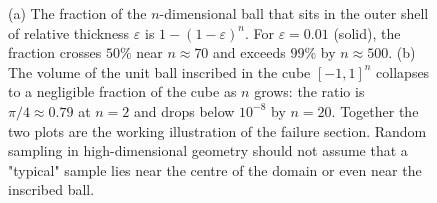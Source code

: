 \begin{figure}[p]
\begin{tikzpicture}
\end{tikzpicture}
\caption[High-dimensional volume concentration in the ball and the
cube.]{(a) The fraction of the $n$-dimensional ball that sits in the
outer shell of relative thickness $\varepsilon$ is $1 - (1 -
\varepsilon)^{n}$. For $\varepsilon = 0.01$ (solid), the fraction
crosses $50\%$ near $n \approx 70$ and exceeds $99\%$ by $n
\approx 500$. (b) The volume of the unit ball inscribed in the cube
$[-1, 1]^{n}$ collapses to a negligible fraction of the cube as $n$
grows: the ratio is $\pi/4 \approx 0.79$ at $n = 2$ and drops below
$10^{-8}$ by $n = 20$. Together the two plots are the working
illustration of the failure section. Random sampling in
high-dimensional geometry should not assume that a "typical" sample
lies near the centre of the domain or even near the inscribed ball.}
\label{fig:vol02:ch11:volume-concentration}
\end{figure}
